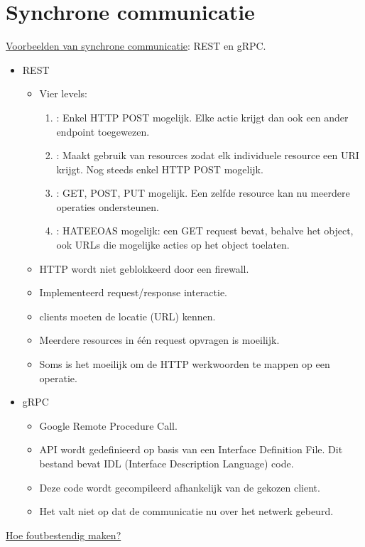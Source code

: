 \documentclass{report}
\begin{document}
	\section{Synchrone communicatie}
	\underline{Voorbeelden van synchrone communicatie}: REST en gRPC.
	\begin{itemize}
		\item[\info] REST
		\begin{itemize}
			\item[\info] Vier levels:
			\begin{enumerate}
				\item[0]: Enkel HTTP POST mogelijk. Elke actie krijgt dan ook een ander endpoint toegewezen.
				\item[1]: Maakt gebruik van resources zodat elk individuele resource een URI krijgt. Nog steeds enkel HTTP POST mogelijk.
				\item[2]: GET, POST, PUT mogelijk. Een zelfde resource kan nu meerdere operaties ondersteunen.
				\item[3]: HATEEOAS mogelijk: een GET request bevat, behalve het object, ook URLs die mogelijke acties op het object toelaten.
			\end{enumerate}
			\item[\good] HTTP wordt niet geblokkeerd door een firewall.
			\item[\good] Implementeerd request/response interactie.
			\item[\alert] clients moeten de locatie (URL) kennen.
			\item[\alert] Meerdere resources in één request opvragen is moeilijk. 
			\item[\alert] Soms is het moeilijk om de HTTP werkwoorden te mappen op een operatie.
		\end{itemize}
		\item[\info] gRPC
		\begin{itemize}
			\item[\info] Google Remote Procedure Call.
			\item[\info] API wordt gedefinieerd op basis van een Interface Definition File. Dit bestand bevat IDL (Interface Description Language) code.
			\item[\info] Deze code wordt gecompileerd afhankelijk van de gekozen client.
			\item[\alert] Het valt niet op dat de communicatie nu over het netwerk gebeurd.
		\end{itemize}
	\end{itemize}
	\underline{Hoe foutbestendig maken?}
\end{document}
